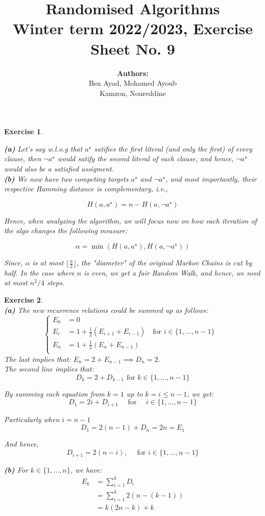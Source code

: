 \documentclass{article}
\title{Randomised Algorithms \\
Winter term 2022/2023, Exercise Sheet No. 9}
\author{
    \textbf{Authors:} \\
    Ben Ayad, Mohamed Ayoub \\
    Kamzon, Noureddine
}
\newcommand{\floor}[1]{\lfloor #1 \rfloor}
\newtheorem{exo}{Exercise}
\begin{document}
\maketitle


\begin{exo}{\ \\}

\noindent
\textbf{(a)} Let's say w.l.o.g  that $a^\star$ satifies the first literal (and only the first) of every clause, then $\neg{a^\star}$ would satify the second literal of each clause, and hence, $\neg{a^\star}$  would also be a satisfied assigment. \\

\noindent
\textbf{(b)} We now have two competing targets $a^\star$ and $\neg{a^\star}$, and most importantly, their respective Hamming distance is complementary, i.e.,

\[
    H(a, a^\star) = n - H(a, \neg{a^\star})
\]

Hence, when analyzing the algorithm, we will focus now on how each iteration of the algo changes the following measure:

\[
    \alpha = \min{(H(a, a^\star), H(a, \neg{a^\star}))}
\]

Since, $\alpha$ is at most $\floor{\frac{n}{2}}$, the "diameter" of the original Markov Chains is cut by half. In the case where $n$ is even, we get a fair Random Walk, and hence, we need at most $n^2/4$ steps.


    
\end{exo}
\begin{exo}{\ \\}
\noindent 
\textbf{(a)} The new recurrence relations could be summed up as follows:
\[
\begin{cases}
    E_0 
    &= 0 \\
    E_i 
    &= 1 + \frac{1}{2} (E_{i+1}+E_{i-1})
    \quad \text{for $i \in \{1, \dots, n-1\}$ }
    \\
    E_n 
    &= 1 + \frac{1}{2} (E_{n}+E_{n-1})\\
\end{cases}
\]
The last implies that: $E_n = 2 +E_{n-1} \implies D_n = 2$.\\   
The second line implies that:
\[
D_k = 2 + D_{k-1} \text{ for } k \in \{1, \dots, n-1\}
\]

By summing each equation from $k=1$ up to $k = i \leq n-1$, we get:
\[
D_1 = 2i + D_{i+1}\quad \text{ for } \quad i \in \{1, \dots, n-1\}
\]

Particularly when $i=n-1$
\[
D_1 = 2(n-1) + D_{n} = 2n = E_1
\]

And hence, \[
D_{i+1} = 2(n-i), \quad \text{ for } i \in \{1, \dots, n-1\}
\]
   
\noindent 
\textbf{(b)} For $k \in \{1, \dots, n\}$, we have:
\begin{align*}
E_k 
&= \sum^{k}_{i=1} D_i  \\   
&= \sum^{k}_{i=1} 2(n-(k-1)) \\
&= k (2n -k) + k
\end{align*}


\end{exo}
\end{document}
